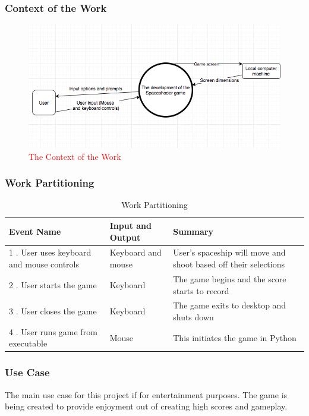 \documentclass[12pt, titlepage]{article}
\begin{document}
\subsubsection{Context of the Work}
\begin{figure}[H]
\centering
\includegraphics[scale=0.5]{CONTEXTDIAGRAM}
\caption{\textcolor{red}{The Context of the Work}}
\end{figure}

 
\subsubsection{Work Partitioning}
 

\begin{table}[H]
\caption{Work Partitioning}
{
\color{red} \begin{tabular}{ |p{4cm}|p{4cm}|p{4cm}| }
\hline 
Event Name  & Input and Output  & Summary \\ \hline
        1 . User uses keyboard and mouse controls &  Keyboard and mouse  &  User's spaceship will move and shoot based off their selections  \\ \hline
        2 . User starts the game        &  Keyboard    &  The game begins and the score starts to record    \\ \hline 
        3 .  User closes the game         &   Keyboard  &  The game exits to desktop and shuts down    \\ \hline
        4 .  User runs game from executable          &   Mouse   &    This initiates the game in Python   \\ \hline
\end{tabular}
}

\end{table}


\subsubsection{Use Case}
The main use case for this project if for entertainment purposes. The game is being created to provide enjoyment out of creating high scores and gameplay.
\end{document}
